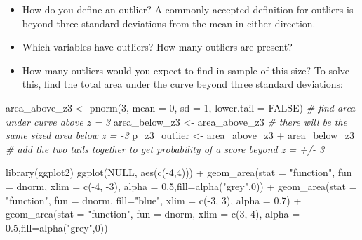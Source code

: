 \documentclass[
]{book}
\newenvironment{Shaded}{\begin{snugshade}}{\end{snugshade}}
\newcommand{\AttributeTok}[1]{\textcolor[rgb]{0.77,0.63,0.00}{#1}}
\newcommand{\CommentTok}[1]{\textcolor[rgb]{0.56,0.35,0.01}{\textit{#1}}}
\newcommand{\ConstantTok}[1]{\textcolor[rgb]{0.00,0.00,0.00}{#1}}
\newcommand{\DecValTok}[1]{\textcolor[rgb]{0.00,0.00,0.81}{#1}}
\newcommand{\FloatTok}[1]{\textcolor[rgb]{0.00,0.00,0.81}{#1}}
\newcommand{\FunctionTok}[1]{\textcolor[rgb]{0.00,0.00,0.00}{#1}}
\newcommand{\NormalTok}[1]{#1}
\newcommand{\OtherTok}[1]{\textcolor[rgb]{0.56,0.35,0.01}{#1}}
\newcommand{\SpecialCharTok}[1]{\textcolor[rgb]{0.00,0.00,0.00}{#1}}
\newcommand{\StringTok}[1]{\textcolor[rgb]{0.31,0.60,0.02}{#1}}
\begin{document}
\begin{itemize}
\item
  How do you define an outlier? A commonly accepted definition for outliers is beyond three standard deviations from the mean in either direction.
\item
  Which variables have outliers? How many outliers are present?
\item
  How many outliers would you expect to find in sample of this size? To solve this, find the total area under the curve beyond three standard deviations:
\end{itemize}

\begin{Shaded}
\begin{Highlighting}[]
\NormalTok{area\_above\_z3 }\OtherTok{\textless{}{-}} \FunctionTok{pnorm}\NormalTok{(}\DecValTok{3}\NormalTok{, }\AttributeTok{mean =} \DecValTok{0}\NormalTok{, }\AttributeTok{sd =} \DecValTok{1}\NormalTok{, }\AttributeTok{lower.tail =} \ConstantTok{FALSE}\NormalTok{) }\CommentTok{\# find area under curve above z = 3}
\NormalTok{area\_below\_z3 }\OtherTok{\textless{}{-}}\NormalTok{ area\_above\_z3 }\CommentTok{\# there will be the same sized area below z = {-}3}
\NormalTok{p\_z3\_outlier }\OtherTok{\textless{}{-}}\NormalTok{ area\_above\_z3 }\SpecialCharTok{+}\NormalTok{ area\_below\_z3 }\CommentTok{\# add the two tails together to get probability of a score beyond z = +/{-} 3}

\FunctionTok{library}\NormalTok{(ggplot2)}
\FunctionTok{ggplot}\NormalTok{(}\ConstantTok{NULL}\NormalTok{, }\FunctionTok{aes}\NormalTok{(}\FunctionTok{c}\NormalTok{(}\SpecialCharTok{{-}}\DecValTok{4}\NormalTok{,}\DecValTok{4}\NormalTok{))) }\SpecialCharTok{+}
  \FunctionTok{geom\_area}\NormalTok{(}\AttributeTok{stat =} \StringTok{"function"}\NormalTok{, }\AttributeTok{fun =}\NormalTok{ dnorm, }\AttributeTok{xlim =} \FunctionTok{c}\NormalTok{(}\SpecialCharTok{{-}}\DecValTok{4}\NormalTok{, }\SpecialCharTok{{-}}\DecValTok{3}\NormalTok{), }\AttributeTok{alpha =} \FloatTok{0.5}\NormalTok{,}\AttributeTok{fill=}\FunctionTok{alpha}\NormalTok{(}\StringTok{"grey"}\NormalTok{,}\DecValTok{0}\NormalTok{)) }\SpecialCharTok{+}
  \FunctionTok{geom\_area}\NormalTok{(}\AttributeTok{stat =} \StringTok{"function"}\NormalTok{, }\AttributeTok{fun =}\NormalTok{ dnorm, }\AttributeTok{fill=}\StringTok{"blue"}\NormalTok{, }\AttributeTok{xlim =} \FunctionTok{c}\NormalTok{(}\SpecialCharTok{{-}}\DecValTok{3}\NormalTok{, }\DecValTok{3}\NormalTok{), }\AttributeTok{alpha =} \FloatTok{0.7}\NormalTok{) }\SpecialCharTok{+}
  \FunctionTok{geom\_area}\NormalTok{(}\AttributeTok{stat =} \StringTok{"function"}\NormalTok{, }\AttributeTok{fun =}\NormalTok{ dnorm, }\AttributeTok{xlim =} \FunctionTok{c}\NormalTok{(}\DecValTok{3}\NormalTok{, }\DecValTok{4}\NormalTok{), }\AttributeTok{alpha =} \FloatTok{0.5}\NormalTok{,}\AttributeTok{fill=}\FunctionTok{alpha}\NormalTok{(}\StringTok{"grey"}\NormalTok{,}\DecValTok{0}\NormalTok{))}
\end{Highlighting}
\end{Shaded}
\end{document}
